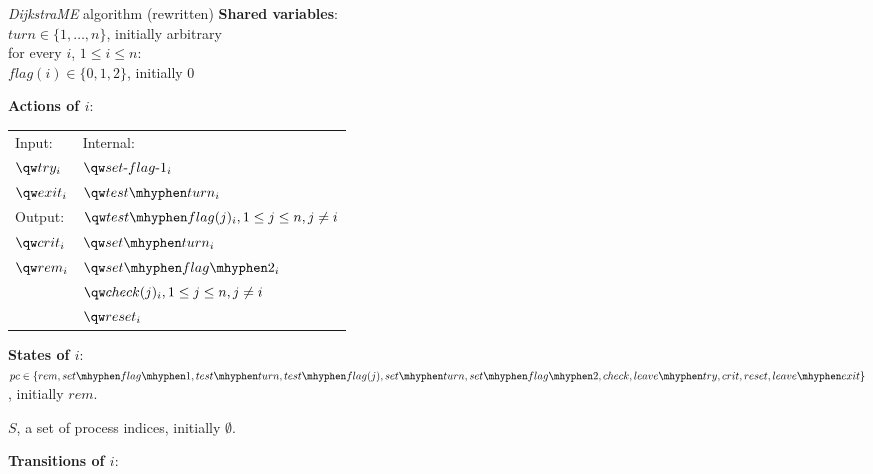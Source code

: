 \documentclass[11pt]{article}
\def \rem {rem}
\def \setflagi {set\mhyphen flag\mhyphen 1}
\def \testturn {test\mhyphen turn}
\def \testflag {test\mhyphen flag}
\def \setturn {set\mhyphen turn}
\def \setflagii {set\mhyphen flag\mhyphen 2}
\def \leavetry {leave\mhyphen try}
\def \leaveexit {leave\mhyphen exit}
\begin{document}
\begin{Block}{\textit{DijkstraME} algorithm (rewritten)}
\textbf{Shared variables}:\\
\(turn\in\{1,\dots,n\}\), initially arbitrary\\
for every \(i\), \(1\le i\le n\):\\
\indent\(flag(i)\in\{0,1,2\}\), initially 0

\noindent \textbf{Actions of \(i\)}:\\
\begin{tabular}{ll}
Input:\hspace{3cm} & Internal:\\
\(\qw try_i\) & \(\qw set\text{-}flag\text{-}1_i\)\\
\(\qw exit_i\) & \(\qw test\mhyphen turn_i\)\\
Output: & \(\qw test\mhyphen flag(j)_i,1\le j\le n,j\neq i\)\\
\(\qw crit_i\) & \(\qw set\mhyphen turn_i\)\\
\(\qw rem_i\) & \(\qw set\mhyphen flag\mhyphen 2_i\)\\
 & \(\qw check(j)_i,1\le j\le n,j\neq i\)\\
 & \(\qw reset_i\)\\
\end{tabular}


\noindent \textbf{States of \(i\)}:\\
\(pc\in\{\rem,\setflagi,\testturn,\testflag(j),\setturn,\allowbreak \setflagii,check,\\\leavetry,crit,reset,\leaveexit\}\),
initially \(rem\).

\(S\), a set of process indices, initially \(\emptyset\).

\noindent \textbf{Transitions of \(i\)}:


\end{Block}
\end{document}

